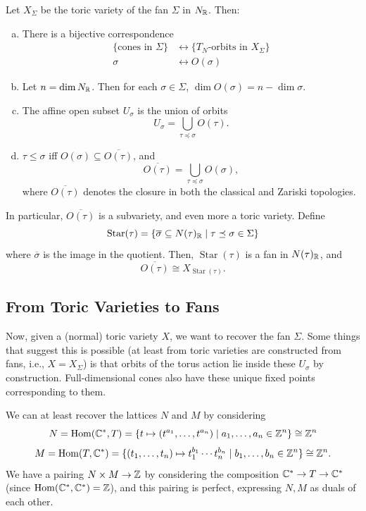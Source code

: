 \documentclass[12pt]{article}
\DeclareMathOperator{\Star}{Star}
\begin{document}
\begin{thm}\label{thm:orbit_cone}
    Let $X_\Sigma$ be the toric variety of the fan $\Sigma$ in $N_{\mathbb{R}}$. Then:
    \begin{enumerate}[(a)]
        \item There is a bijective correspondence
        \begin{align*}
            \{\text{cones in }\Sigma\} &\longleftrightarrow \{\text{$T_N$-orbits in $X_\Sigma$}\}\\
            \sigma &\longleftrightarrow O(\sigma)
        \end{align*}
        \item Let $n=\dim N_{\mathbb{R}}$. Then for each $\sigma\in \Sigma$, $\dim O(\sigma) = n-\dim \sigma$.
        \item The affine open subset $U_\sigma$ is the union of orbits
        \[U_\sigma = \bigcup_{\tau\preceq \sigma} O(\tau).\]
        \item $\tau\leq \sigma$ iff $O(\sigma) \subseteq \overline{O(\tau)}$, and
        \[\overline{O(\tau)} = \bigcup_{\tau\preceq \sigma} O(\sigma),\]
        where $\overline{O(\tau)}$ denotes the closure in both the classical and Zariski topologies.
    \end{enumerate}
\end{thm}

In particular, $\overline{O(\tau)}$ is a subvariety, and even more a toric variety. Define
\[\Star(\tau) = \{\overline{\sigma}\subseteq N(\tau)_\R \mid \tau\preceq \sigma \in \Sigma\}\]
where $\overline{\sigma}$ is the image in the quotient. Then, $\Star(\tau)$ is a fan in $N(\tau)_{\mathbb{R}}$, and
\[\overline{O(\tau)} \cong X_{\Star(\tau)}.\]
\subsection{From Toric Varieties to Fans}

Now, given a (normal) toric variety $X$, we want to recover the fan $\Sigma$. Some things that suggest this is possible (at least from toric varieties are constructed from fans, i.e., $X=X_\Sigma$) is that orbits of the torus action lie inside these $U_\sigma$ by construction. Full-dimensional cones also have these unique fixed points corresponding to them.

We can at least recover the lattices $N$ and $M$ by considering
\[N= \mathrm{Hom}(\mathbb{C}^*, T) = \{t \mapsto (t^{a_1},\dots,t^{a_n}) \mid a_1,\dots,a_n\in \mathbb{Z}^n\} \cong \mathbb{Z}^n\]
\[M= \mathrm{Hom}(T, \mathbb{C}^*) = \{(t_1,\dots,t_n) \mapsto t_1^{b_1}\cdots t_n^{b_n} \mid b_1,\dots,b_n\in \mathbb{Z}^n\} \cong \mathbb{Z}^n.\]
We have a pairing $N\times M \to \mathbb{Z}$ by considering the composition $\mathbb{C}^* \to T \to \mathbb{C}^*$ (since $\mathrm{Hom}(\mathbb{C}^*,\mathbb{C}^*)=\mathbb{Z}$), and this pairing is perfect, expressing $N,M$ as duals of each other.
\end{document}
